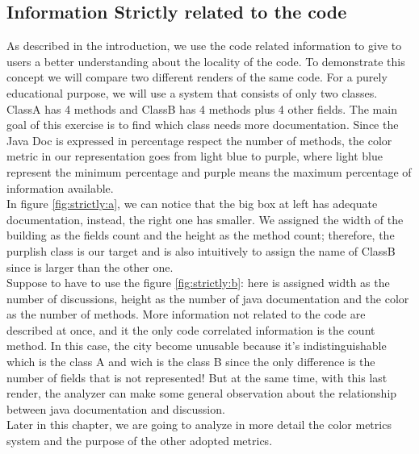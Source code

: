 \documentclass[]{usiinfbachelorproject}
\begin{document}
\subsection{Information Strictly related to the code}
As described in the introduction, we use the code related information to give to users a better understanding about the locality of the code. To demonstrate this concept we will compare two different renders of the same code. For a purely educational purpose, we will use a system that consists of only two classes. ClassA has 4 methods and ClassB has 4 methods plus 4 other fields. The main goal of this exercise is to find which class needs more documentation. Since the Java Doc is expressed in percentage respect the number of methods, the color metric in our representation goes from light blue to purple, where light blue represent the minimum percentage and purple means the maximum percentage of information available.\\ In figure \ref{fig:strictly:a}, we can notice that the big box at left has adequate documentation, instead, the right one has smaller. We assigned the width of the building as the fields count and the height as the method count; therefore, the purplish class is our target and is also intuitively to assign the name of ClassB since is larger than the other one.\\
Suppose to have to use the figure \ref{fig:strictly:b}: here is assigned width as the number of discussions, height as the number of java documentation and the color as the number of methods. More information not related to the code are described at once, and it the only code correlated information is the count method. In this case, the city become unusable because it's indistinguishable which is the class A and wich is the class B since the only difference is the number of fields that is not represented! But at the same time, with this last render, the analyzer can make some general observation about the relationship between java documentation and discussion.\\
Later in this chapter, we are going to analyze in more detail the color metrics system and the purpose of the other adopted metrics.

 
 
 
 
\end{document}
